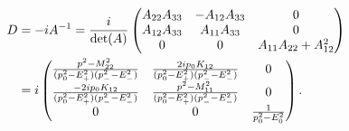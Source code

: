 \documentclass{article}
\begin{document}
\begin{align}
    \notag
    D & = - i A^{-1} = \frac{i}{\det(A)}
    \begin{pmatrix}
        A_{22} A_{33} & -A_{12}A_{33} & 0 \\
        A_{12}A_{33} & A_{11}A_{33} & 0 \\
        0 & 0 & A_{11}A_{22} + A_{12}^2
    \end{pmatrix} \\
    & = i
    \begin{pmatrix}
        \frac{
            p^2 - M_{22}^2
        }
        {
            (p_0^2 - E_+^2)(p_-^2 - E_-^2)
        } 
        & \frac{
            2ip_0K_{12}
        }
        {
            (p_0^2 - E_+^2)(p_-^2 - E_-^2)
        } & 0 \\
        \frac{
            - 2ip_0K_{12}
        }
        {
            (p_0^2 - E_+^2)(p_-^2 - E_-^2)
        }
        & \frac{
            p^2 - M_{11}^2
        }
        {
            (p_0^2 - E_+^2)(p_-^2 - E_-^2)
        } & 0 \\
        0 & 0 & 
        \frac{1}{p_0^2 - E_0^2}
    \end{pmatrix}.
\end{align}



\printbibliography

\clearpage


\clearpage
\printnoidxglossaries
\end{document}
